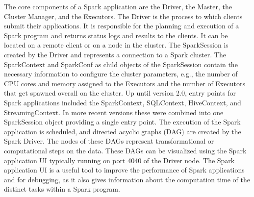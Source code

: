 \noindent The core components of a Spark application are the Driver, the Master, the Cluster Manager, and the Executors. The Driver is the process to which clients submit their applications. It is responsible for the planning and execution of a Spark program and returns status logs and results to the clients. It can be located on a remote client or on a node in the cluster. The SparkSession is created by the Driver and represents a connection to a Spark cluster. The SparkContext and SparkConf as child objects of the SparkSession contain the necessary information to configure the cluster parameters, e.g., the number of CPU cores and memory assigned to the Executors and the number of Executors that get spawned overall on the cluster. Up until version 2.0, entry points for Spark applications included the SparkContext, SQLContext, HiveContext, and StreamingContext. In more recent versions these were combined into one SparkSession object providing a single entry point.
The execution of the Spark application is scheduled, and directed acyclic graphs (DAG) are created by the Spark Driver. The nodes of these DAGs represent transformational or computational steps on the data. These DAGs can be visualized using the Spark application UI typically running on port 4040 of the Driver node. The Spark application UI is a useful tool to improve the performance of Spark applications and for debugging, as it also gives information about the computation time of the distinct tasks within a Spark program.~\cite[pp. 45ff]{sparkbook1}\\

